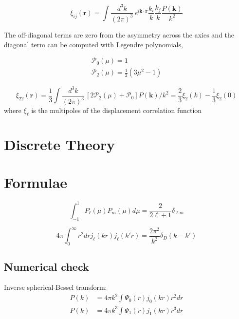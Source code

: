 \documentclass[a4paper,11pt]{article}
\begin{document}
\begin{equation}
  \xi_{ij}(\bm{r}) = \int \frac{d^3 k}{(2\pi)^3}\,
                    e^{i\bm{k} \cdot \bm{r}} \frac{k_i}{k} \frac{k_j}{k}
                    \frac{P(\bm{k})}{k^2}
\end{equation}

The off-diagonal terms are zero from the asymmetry across the axies
and the diagonal term can be computed with Legendre polynomials,

\begin{align}
  \mathcal{P}_0(\mu) = 1\\
  \mathcal{P}_2(\mu) = \frac{1}{2} \left( 3 \mu^2 - 1 \right)
\end{align}


\begin{equation}
  \xi_{22}(\bm{r}) = \frac{1}{3} \int \frac{d^3 k}{(2\pi)^3} \,
             \left[ 2 \mathcal{P}_2(\mu) + \mathcal{P}_0 \right] P(\bm{k})/k^2
             = \frac{2}{3}  \xi_2(k) - \frac{1}{3} \xi_2(0)
\end{equation}
where $\xi_\ell$ is the multipoles of the displacement correlation function

\section{Discrete Theory}

\section{Formulae}

\begin{equation}
  \int_{-1}^1 P_\ell(\mu) P_m(\mu) d\mu = \frac{2}{2 \ell + 1} \delta_{\ell m}
\end{equation}

\begin{equation}
  4\pi \int_0^\infty r^2 dr j_\ell(kr) j_\ell(k'r) =
    \frac{2\pi^2}{k^2} \delta_D(k - k')
\end{equation}

\subsection{Numerical check}

Inverse spherical-Bessel transform:
\begin{align}
  P(k) &= 4 \pi k^2 \int \Psi_0(r) j_0(kr) r^2 dr\\
  P(k) &= 4 \pi k^3 \int \Psi_1(r) j_1(kr) r^3 dr
\end{align}
\end{document}
